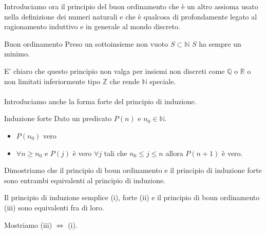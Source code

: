 Introduciamo ora il principio del buon ordinamento che è un altro assioma usato nella definizione dei numeri naturali e che è qualcosa di profondamente legato al ragionamento induttivo e in generale al mondo discreto.
\begin{definition}{Buon ordinamento}
    Preso un sottoinsieme non vuoto $S \subset \mathbb{N}$ $S$ ha sempre un minimo.
\end{definition}
E' chiaro che questo principio non valga per insiemi non discreti come $\mathbb{Q}$ o $\mathbb{R}$ o non limitati inferiormente tipo $\mathbb{Z}$ che rende $\mathbb{N}$ speciale. \\ \\ Introduciamo anche la forma forte del principio di induzione.
\begin{definition}{Induzione forte}
    Dato un predicato $P(n)$ e $n_0\in \mathbb{N}$.
    \begin{itemize}
        \item $P(n_0)$ vero
        \item $\forall n\ge n_0$ e $P(j)$ è vero $\forall j$ tali che $n_0\le j \le n$ allora $P(n+1)$ è vero.
    \end{itemize}
\end{definition}
Dimostriamo che il principio di boun ordinamento e il principio di induzione forte sono entrambi equivalenti al principio di induzione.
\begin{theorem}{}
    Il principio di induzione semplice (i),  forte (ii) e il principio di boun ordinamento (iii) sono equivalenti fra di loro.
\end{theorem}
Mostriamo (iii) $\iff$ (i).

